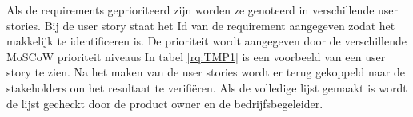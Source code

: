 %
%
%
%
\whitespace
Als de requirements geprioriteerd zijn worden ze genoteerd in verschillende user stories.
Bij de user story staat het Id van de requirement aangegeven zodat het makkelijk te identificeren is.
De prioriteit wordt aangegeven door de verschillende MoSCoW prioriteit niveaus
In tabel \ref{rq:TMP1} is een voorbeeld van een user story te zien.
Na het maken van de user stories wordt er terug gekoppeld naar de stakeholders om het resultaat te verifiëren.
Als de volledige lijst gemaakt is wordt de lijst gecheckt door de product owner en de bedrijfsbegeleider.


